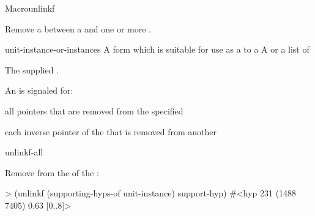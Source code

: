 \documentclass[10pt,twoside,english,pdftex]{article}
\begin{document}

\begin{functiondoc}{Macro}{unlinkf}%
  {
    \returns{} } 
%
%

\fnsyntax

\fnpurpose Remove a  between a  and one
or more .

\fnpackage {}

\fnmodule {}

\fnargs
\begin{args}{unit-instance-or-instances}
 A form which is suitable for use as a
 to a 
 A  or a
list of 
\end{args}

\fnreturns The supplied .

\fnevents
{}%
%
%
%
%
%
An  is signaled for:
\begin{tightitemize}
\item all pointers that are removed from the specified
\item each inverse pointer of the  that is removed from
  another 
\end{tightitemize}

\begin{alsos}{unlinkf-all}
\also[linkf]
\end{alsos}

\fnexample Remove  from the 
 of the  
:
%
\W\supp
\begin{example}
> (unlinkf (supporting-hyps-of unit-instance) support-hyp)
#<hyp 231 (1488 7405) 0.63 [0..8]>
\end{example}

\end{functiondoc}

\end{document}
